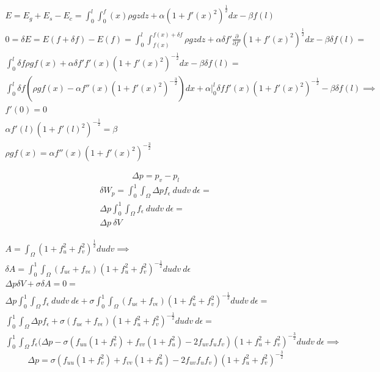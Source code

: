 \documentclass{article}
\begin{document}
\begin{gather}
    E = E_g+E_s-E_c = 
    \int_0^l \int_0^f(x) \rho g z dz + \alpha (1+f'(x)^2)^\frac{1}{2} dx - \beta f(l) \\
    0 = \delta E = E(f+\delta f)-E(f) = \int_0^l \int_{f(x)}^{f(x)+\delta f} \rho g z dz + \alpha \delta f' \frac{\partial}{\partial f'} (1+f'(x)^2)^\frac{1}{2} dx - \beta \delta f(l) = \\
    \int_0^l \delta f \rho g f(x) + \alpha \delta f' f'(x) (1+f'(x)^2)^{-\frac{1}{2}} dx - \beta \delta f(l) = \\
    \int_0^l \delta f (\rho g f(x) - \alpha f''(x) (1+f'(x)^2)^{-\frac{3}{2}} ) dx + \alpha \Big |_0^l \delta f f'(x) (1+f'(x)^2)^{-\frac{1}{2}} - \beta \delta f(l)\implies \\
    f'(0) = 0 \\
    \alpha f'(l) (1+f'(l)^2)^{-\frac{1}{2}} = \beta \\
    \rho g f(x) = \alpha f''(x) (1+f'(x)^2)^{-\frac{3}{2}}
\end{gather}

\[\Delta p = p_v-p_l\]
\begin{gather}
\delta W_p = \int_0^1 \int_\Omega \Delta p f_\epsilon \  du dv\ d\epsilon = \\
\Delta p \int_0^1 \int_\Omega f_\epsilon\ du dv\ d\epsilon = \\
\Delta p\ \delta V
\end{gather}

\begin{gather}
    A = \int_\Omega (1+f_u^2+f_v^2)^{\frac{1}{2}} du dv \implies \\
    \delta A = \int_0^1 \int_\Omega (f_{u\epsilon}+f_{v\epsilon})(1+f_u^2+f_v^2)^{-\frac{1}{2}} du dv\ d\epsilon \\
    \Delta p \delta V + \sigma \delta A = 0 = \\
    \Delta p \int_0^1 \int_\Omega f_\epsilon\ du dv\ d\epsilon + \sigma \int_0^1 \int_\Omega (f_{u\epsilon}+f_{v\epsilon})(1+f_u^2+f_v^2)^{-\frac{1}{2}} du dv\ d\epsilon = \\
    \int_0^1 \int_\Omega \Delta p f_\epsilon + \sigma (f_{u\epsilon}+f_{v\epsilon})(1+f_u^2+f_v^2)^{-\frac{1}{2}} du dv\ d\epsilon = \\
    \int_0^1 \int_\Omega f_\epsilon (\Delta p  - \sigma (f_{uu}(1+f_v^2)+f_{vv}(1+f_u^2)-2f_{uv} f_u f_v)(1+f_u^2+f_v^2)^{-\frac{3}{2}} du dv\ d\epsilon \implies
\end{gather}
\begin{equation}
\label {Young_Laplace_differential}
    \Delta p  = \sigma (f_{uu}(1+f_v^2)+f_{vv}(1+f_u^2)-2f_{uv} f_u f_v)(1+f_u^2+f_v^2)^{-\frac{3}{2}}
\end{equation}
\end{document}
